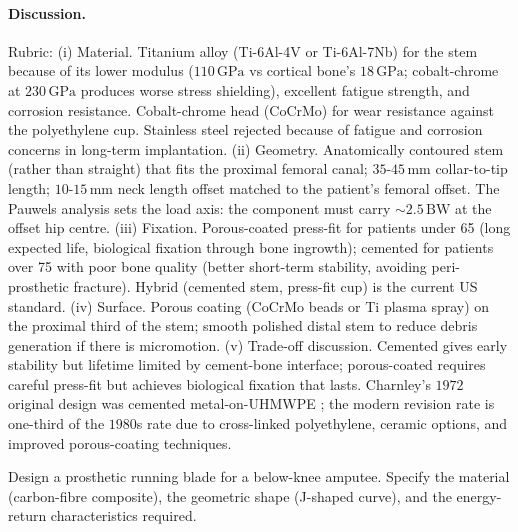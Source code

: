 \paragraph{Discussion.}
Rubric: (i) Material. Titanium alloy (Ti-6Al-4V or Ti-6Al-7Nb) for
the stem because of its lower modulus ($110\,\text{GPa}$ vs cortical
bone's $18\,\text{GPa}$; cobalt-chrome at $230\,\text{GPa}$ produces
worse stress shielding), excellent fatigue strength, and corrosion
resistance. Cobalt-chrome head (CoCrMo) for wear resistance against
the polyethylene cup. Stainless steel rejected because of fatigue
and corrosion concerns in long-term implantation.
(ii) Geometry. Anatomically contoured stem (rather than straight)
that fits the proximal femoral canal; $35$-$45\,\text{mm}$
collar-to-tip length; $10$-$15\,\text{mm}$ neck length offset matched
to the patient's femoral offset. The Pauwels analysis
\cite[ch.~3]{paper:v6c06-pauwels-1976} sets the load axis: the
component must carry $\sim 2.5\,\text{BW}$ at the offset hip centre.
(iii) Fixation. Porous-coated press-fit for patients under 65 (long
expected life, biological fixation through bone ingrowth); cemented
for patients over 75 with poor bone quality (better short-term
stability, avoiding peri-prosthetic fracture). Hybrid (cemented stem,
press-fit cup) is the current US standard.
(iv) Surface. Porous coating (CoCrMo beads or Ti plasma spray) on the
proximal third of the stem; smooth polished distal stem to reduce
debris generation if there is micromotion.
(v) Trade-off discussion. Cemented gives early stability but lifetime
limited by cement-bone interface; porous-coated requires careful
press-fit but achieves biological fixation that lasts. Charnley's
$1972$ original design was cemented metal-on-UHMWPE
\cite[p.~64]{paper:v6c06-charnley-1972}; the modern revision rate
is one-third of the $1980$s rate
\cite[ch.~14]{text:mow-huiskes-orthopaedic} due to cross-linked
polyethylene, ceramic options, and improved porous-coating
techniques.

\begin{exercise}
Design a prosthetic running blade for a below-knee amputee. Specify
the material (carbon-fibre composite), the geometric shape (J-shaped
curve), and the energy-return characteristics required.
\end{exercise}

